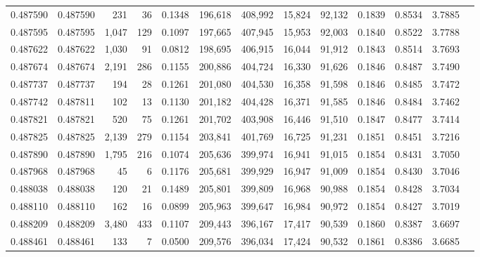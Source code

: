 \begin{tabular}{rrrrrrrrrrrrr}
0.487590 & 0.487590 &   231 &    36 &                                     0.1348 & 196,618 & 408,992 &  15,824 &  92,132 & 0.1839 & 0.8534 & 3.7885 \\
0.487595 & 0.487595 & 1,047 &   129 &                                     0.1097 & 197,665 & 407,945 &  15,953 &  92,003 & 0.1840 & 0.8522 & 3.7788 \\
0.487622 & 0.487622 & 1,030 &    91 &                                     0.0812 & 198,695 & 406,915 &  16,044 &  91,912 & 0.1843 & 0.8514 & 3.7693 \\
0.487674 & 0.487674 & 2,191 &   286 &                                     0.1155 & 200,886 & 404,724 &  16,330 &  91,626 & 0.1846 & 0.8487 & 3.7490 \\
0.487737 & 0.487737 &   194 &    28 &                                     0.1261 & 201,080 & 404,530 &  16,358 &  91,598 & 0.1846 & 0.8485 & 3.7472 \\
0.487742 & 0.487811 &   102 &    13 &                                     0.1130 & 201,182 & 404,428 &  16,371 &  91,585 & 0.1846 & 0.8484 & 3.7462 \\
0.487821 & 0.487821 &   520 &    75 &                                     0.1261 & 201,702 & 403,908 &  16,446 &  91,510 & 0.1847 & 0.8477 & 3.7414 \\
0.487825 & 0.487825 & 2,139 &   279 &                                     0.1154 & 203,841 & 401,769 &  16,725 &  91,231 & 0.1851 & 0.8451 & 3.7216 \\
0.487890 & 0.487890 & 1,795 &   216 &                                     0.1074 & 205,636 & 399,974 &  16,941 &  91,015 & 0.1854 & 0.8431 & 3.7050 \\
0.487968 & 0.487968 &    45 &     6 &                                     0.1176 & 205,681 & 399,929 &  16,947 &  91,009 & 0.1854 & 0.8430 & 3.7046 \\
0.488038 & 0.488038 &   120 &    21 &                                     0.1489 & 205,801 & 399,809 &  16,968 &  90,988 & 0.1854 & 0.8428 & 3.7034 \\
0.488110 & 0.488110 &   162 &    16 &                                     0.0899 & 205,963 & 399,647 &  16,984 &  90,972 & 0.1854 & 0.8427 & 3.7019 \\
0.488209 & 0.488209 & 3,480 &   433 &                                     0.1107 & 209,443 & 396,167 &  17,417 &  90,539 & 0.1860 & 0.8387 & 3.6697 \\
0.488461 & 0.488461 &   133 &     7 &                                     0.0500 & 209,576 & 396,034 &  17,424 &  90,532 & 0.1861 & 0.8386 & 3.6685 \\

\end{tabular}

